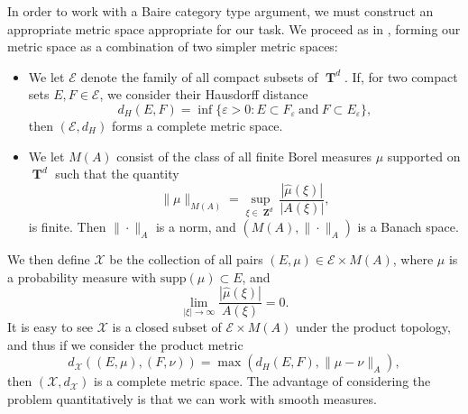 \documentclass[12pt,reqno]{article}
\numberwithin{equation}{section}
\DeclareMathOperator{\ZZ}{\mathbf{Z}}
\DeclareMathOperator{\TT}{\mathbf{T}}
\begin{document}
In order to work with a Baire category type argument, we must construct an appropriate metric space appropriate for our task. We proceed as in \cite{Korner2}, forming our metric space as a combination of two simpler metric spaces:
%
\begin{itemize}
    \item We let $\mathcal{E}$ denote the family of all compact subsets of $\TT^d$. If, for two compact sets $E,F \in \mathcal{E}$, we consider their Hausdorff distance
    \[ d_H(E,F) = \inf \{ \varepsilon > 0 : E \subset F_\varepsilon\ \text{and}\ F \subset E_\varepsilon \}, \]
    then $(\mathcal{E},d_H)$ forms a complete metric space.

    \item We let $M(A)$ consist of the class of all finite Borel measures $\mu$ supported on $\TT^d$ such that the quantity
    \[ \| \mu \|_{M(A)} =  \sup_{\xi \in \ZZ^d} \frac{|\widehat{\mu}(\xi)|}{|A(\xi)|}, \]
    is finite. Then $\| \cdot \|_A$ is a norm, and $(M(A), \| \cdot \|_A)$ is a Banach space.
\end{itemize}
%
We then define $\mathcal{X}$ be the collection of all pairs $(E,\mu) \in \mathcal{E} \times M(A)$, where $\mu$ is a probability measure with $\text{supp}(\mu) \subset E$, and
%
\[ \lim_{|\xi| \to \infty} \frac{|\widehat{\mu}(\xi)|}{A(\xi)} = 0. \]
%
It is easy to see $\mathcal{X}$ is a closed subset of $\mathcal{E} \times M(A)$ under the product topology, and thus if we consider the product metric
%
\[ d_{\mathcal{X}}((E,\mu),(F,\nu)) = \max \left( d_H(E,F), \| \mu - \nu \|_A \right), \]
%
then $(\mathcal{X},d_\mathcal{X})$ is a complete metric space. The advantage of considering the problem quantitatively is that we can work with smooth measures.
\end{document}
